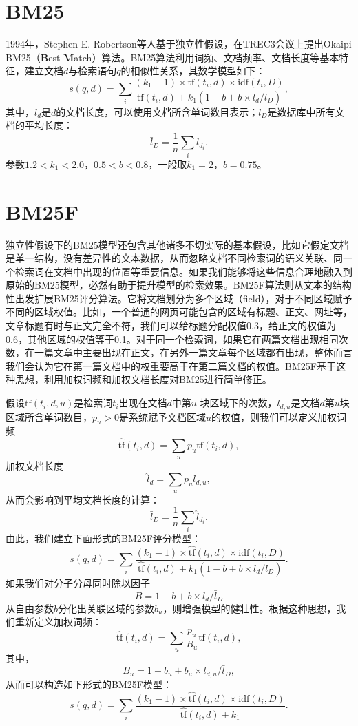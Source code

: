 \section{BM25}
1994年，Stephen E. Robertson等人\cite{robertson1996okapi}基于独立性假设，在TREC3会议上提出Okaipi BM25（\textbf{B}est \textbf{M}atch）算法。BM25算法利用词频、文档频率、文档长度等基本特征，建立文档$d$与检索语句$q$的相似性关系，其数学模型如下：
\begin{equation}\label{eq:bm25}
    s(q,d) = \sum\limits_i \frac{(k_1 - 1)\times \textrm{tf}(t_i,d) \times \textrm{idf}(t_i,D)}{\mathrm{tf}(t_i,d) + k_1(1 - b + b \times l_d /\bar l_D)},
\end{equation}
其中，$l_d$是$d$的文档长度，可以使用文档所含单词数目表示；$\bar l_D$是数据库中所有文档的平均长度：
\[
    \bar l_D = \frac{1}{n} \sum\limits_i l_{d_i}.
\]
参数$1.2 < k_1 < 2.0$，$0.5 < b < 0.8$，一般取$k_1=2$，$b=0.75$。

\section{BM25F}
独立性假设下的BM25模型还包含其他诸多不切实际的基本假设，比如它假定文档是单一结构，没有差异性的文本数据，从而忽略文档不同检索词的语义关联、同一个检索词在文档中出现的位置等重要信息。如果我们能够将这些信息合理地融入到原始的BM25模型，必然有助于提升模型的检索效果。BM25F算法则从文本的结构性出发扩展BM25评分算法。它将文档划分为多个区域（field），对于不同区域赋予不同的区域权值。比如，一个普通的网页可能包含的区域有标题、正文、网址等，文章标题有时与正文完全不符，我们可以给标题分配权值0.3，给正文的权值为0.6，其他区域的权值等于0.1。对于同一个检索词，如果它在两篇文档出现相同次数，在一篇文章中主要出现在正文，在另外一篇文章每个区域都有出现，整体而言我们会认为它在第一篇文档中的权重要高于在第二篇文档的权值。BM25F基于这种思想，利用加权词频和加权文档长度对BM25进行简单修正。

假设$\mathrm{tf}(t_i, d, u)$是检索词$t_i$出现在文档$d$中第$u$ 块区域下的次数，$l_{d,u}$是文档$d$第$u$块区域所含单词数目，$p_u>0$是系统赋予文档区域$u$的权值，则我们可以定义加权词频
\[
    \hat{\mathrm{tf}}(t_i,d) = \sum\limits_u p_u \mathrm{tf}(t_i, d),
\]
加权文档长度
\[
    \hat l_d = \sum\limits_u p_u l_{d,u},
\]
从而会影响到平均文档长度的计算：
\[
    \bar l_D = \frac{1}{n} \sum\limits_i \hat l_{d_i}.
\]
由此，我们建立下面形式的BM25F评分模型：
\begin{equation}\label{eq:bm25f-1}
     s(q,d) = \sum\limits_i \frac{(k_1 - 1)\times \hat{\textrm{tf}}(t_i,d) \times \textrm{idf}(t_i,D)}{\hat{\textrm{tf}}(t_i,d) + k_1(1 - b + b \times l_d /\bar l_D)}.
\end{equation}
如果我们对分子分母同时除以因子
\[
    B = 1 - b + b \times l_d /\bar l_D
\]
从自由参数$b$分化出关联区域的参数$b_u$，则增强模型的健壮性。根据这种思想，我们重新定义加权词频：
\[
    \hat{\mathrm{tf}}(t_i,d) = \sum\limits_u \frac{p_u}{B_u} \mathrm{tf}(t_i, d),
\]
其中，
\[
    B_u = 1 - b_u + b_u \times l_{d,u}/\bar l_D,
\]
从而可以构造如下形式的BM25F模型：
\begin{equation}\label{eq:bm25f-2}
    s(q,d) = \sum\limits_i \frac{(k_1 - 1)\times \hat{\textrm{tf}}(t_i,d) \times \textrm{idf}(t_i,D)}{\hat{\textrm{tf}}(t_i,d) + k_1}.
\end{equation}

